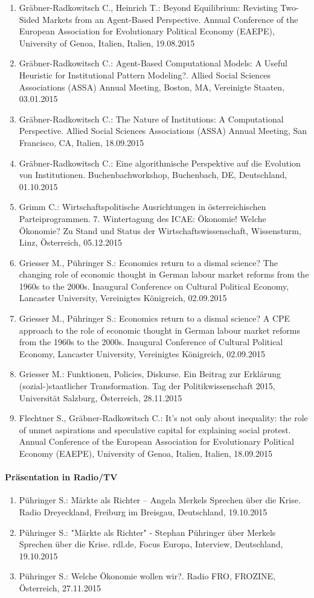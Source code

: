 \begin{enumerate}
	\item Gräbner-Radkowitsch C., Heinrich T.: Beyond Equilibrium: Revisting Two-Sided Markets from an Agent-Based Perspective. Annual Conference of the European Association for Evolutionary Political Economy (EAEPE), University of Genoa, Italien, Italien, 19.08.2015
	\item Gräbner-Radkowitsch C.: Agent-Based Computational Models: A Useful Heuristic for Institutional Pattern Modeling?. Allied Social Sciences Associations (ASSA) Annual Meeting, Boston, MA, Vereinigte Staaten, 03.01.2015
	\item Gräbner-Radkowitsch C.: The Nature of Institutions: A Computational Perspective. Allied Social Sciences Associations (ASSA) Annual Meeting, San Francisco, CA, Italien, 18.09.2015
	\item Gräbner-Radkowitsch C.: Eine algorithmische Perspektive auf die Evolution von Institutionen. Buchenbachworkshop, Buchenbach, DE, Deutschland, 01.10.2015
	\item Grimm C.: Wirtschaftspolitische Ausrichtungen in österreichischen Parteiprogrammen. 7. Wintertagung des ICAE: Ökonomie! Welche Ökonomie? Zu Stand und Status der Wirtschaftswissenschaft, Wissensturm, Linz, Österreich, 05.12.2015
	\item Griesser M., Pühringer S.: Economics return to a dismal science? The changing role of economic thought in German labour market reforms from the 1960s to the 2000s. Inaugural Conference on Cultural Political Economy, Lancaster University, Vereinigtes Königreich, 02.09.2015
	\item Griesser M., Pühringer S.: Economics return to a dismal science? A CPE approach to the role of economic thought in German labour market reforms from the 1960s to the 2000s. Inaugural Conference of Cultural Political Economy, Lancaster University, Vereinigtes Königreich, 02.09.2015
	\item Griesser M.: Funktionen, Policies, Diskurse. Ein Beitrag zur Erklärung (sozial-)staatlicher Transformation. Tag der Politikwissenschaft 2015, Universität Salzburg, Österreich, 28.11.2015
	\item Flechtner S., Gräbner-Radkowitsch C.: It’s not only about inequality: the role of unmet aspirations and speculative capital for explaining social protest. Annual Conference of the European Association for Evolutionary Political Economy (EAEPE), University of Genoa, Italien, Italien, 18.09.2015
\end{enumerate}
\paragraph{Präsentation in Radio/TV}
\begin{enumerate}
	\item Pühringer S.: Märkte als Richter – Angela Merkels Sprechen über die Krise. Radio Dreyeckland, Freiburg im Breisgau, Deutschland, 19.10.2015
	\item Pühringer S.: "Märkte als Richter" - Stephan Pühringer über Merkels Sprechen über die Krise. rdl.de, Focus Europa, Interview, Deutschland, 19.10.2015
	\item Pühringer S.: Welche Ökonomie wollen wir?. Radio FRO, FROZINE, Österreich, 27.11.2015
\end{enumerate}
